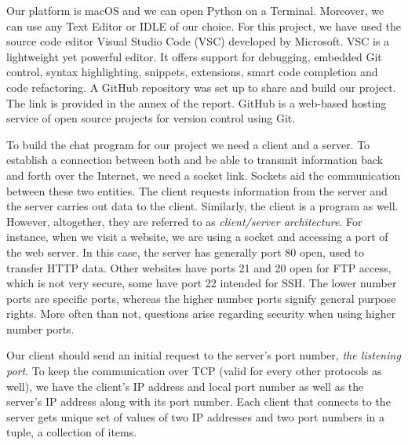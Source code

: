 Our platform is macOS and we can open Python on a Terminal. Moreover, we can use any Text Editor or IDLE of our choice. For this project, we have used the source code editor Visual Studio Code (VSC) developed by Microsoft. VSC is a lightweight yet powerful editor. It offers support for debugging, embedded Git control, syntax highlighting, snippets, extensions, smart code completion and code refactoring. A GitHub repository was set up to share and build our project. The link is provided in the annex of the report. GitHub is a web-based hosting service of open source projects for version control using Git. 

To build the chat program for our project we need a client and a server. To establish a connection between both and be able to transmit information back and forth over the Internet, we need a socket link. Sockets aid the communication between these two entities. The client requests information from the server and the server carries out data to the client. Similarly, the client is a program as well. However, altogether, they are referred to as \emph{client/server architecture}. For instance, when we visit a website, we are using a socket and accessing a port of the web server. In this case, the server has generally port 80 open, used to transfer HTTP data. Other websites have ports 21 and 20 open for FTP access, which is not very secure, some have port 22 intended for SSH. The lower number ports are specific ports, whereas the higher number ports signify general purpose rights. More often than not, questions arise regarding security when using higher number ports. 

Our client should send an initial request to the server's port number, \emph{the listening port}. To keep the communication over TCP (valid for every other protocols as well), we have the client's IP address and local port number as well as the server's IP address along with its port number. Each client that connects to the server gets unique set of values of two IP addresses and two port numbers in a tuple, a collection of items. 